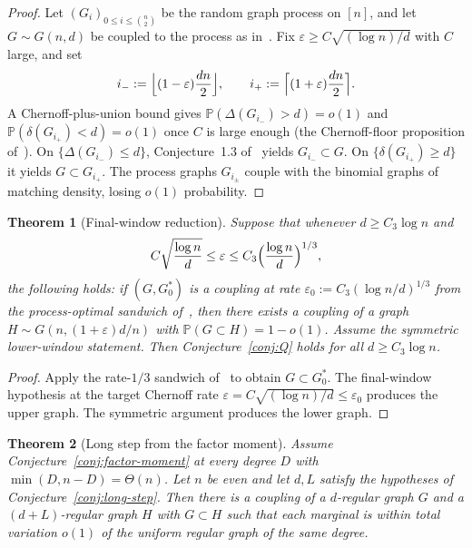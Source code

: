 \documentclass[11pt]{article}
\newtheorem{theorem}{Theorem}
\newcommand{\Gnd}{G(n,d)}
\newcommand{\PP}{\mathbb{P}}
\begin{document}
\begin{proof}
Let \((G_i)_{0\le i\le\binom{n}{2}}\) be the random graph process on \([n]\), and let
\(G\sim\Gnd\) be coupled to the process as in~\cite[Conjecture~1.3]{BIM25}.
Fix \(\varepsilon\ge C\sqrt{(\log n)/d}\) with \(C\) large, and set
\[
i_-:=\Bigl\lfloor(1-\varepsilon)\frac{dn}{2}\Bigr\rfloor,\qquad
i_+:=\Bigl\lceil(1+\varepsilon)\frac{dn}{2}\Bigr\rceil.
\]
A Chernoff-plus-union bound gives
\(\PP(\Delta(G_{i_-})>d)=o(1)\) and \(\PP(\delta(G_{i_+})<d)=o(1)\)
once \(C\) is large enough (the Chernoff-floor proposition of~\cite{PlusOneV1}).
On \(\{\Delta(G_{i_-})\le d\}\), Conjecture~1.3 of~\cite{BIM25} yields
\(G_{i_-}\subset G\).
On \(\{\delta(G_{i_+})\ge d\}\) it yields \(G\subset G_{i_+}\).
The process graphs \(G_{i_\pm}\) couple with the binomial graphs of matching
density, losing \(o(1)\) probability.
\end{proof}

\begin{theorem}[Final-window reduction]
\label{thm:window}
Suppose that whenever \(d\ge C_3\log n\) and
\[
C\sqrt{\frac{\log n}{d}}
\le\varepsilon
\le C_3\Bigl(\frac{\log n}{d}\Bigr)^{1/3},
\]
the following holds: if \((G,G^*_0)\) is a coupling at rate
\(\varepsilon_0:=C_3(\log n/d)^{1/3}\) from the process-optimal sandwich of~\cite{PlusOneV1},
then there exists a coupling of a graph \(H\sim G(n,(1+\varepsilon)d/n)\) with
\(\PP(G\subset H)=1-o(1)\).
Assume the symmetric lower-window statement.
Then Conjecture~\ref{conj:Q} holds for all \(d\ge C_3\log n\).
\end{theorem}

\begin{proof}
Apply the rate-\(1/3\) sandwich of~\cite{PlusOneV1} to obtain \(G\subset G^*_0\).
The final-window hypothesis at the target Chernoff rate
\(\varepsilon=C\sqrt{(\log n)/d}\le\varepsilon_0\) produces the upper graph.
The symmetric argument produces the lower graph.
\end{proof}

\begin{theorem}[Long step from the factor moment]
\label{thm:long-from-moment}
Assume Conjecture~\ref{conj:factor-moment} at every degree \(D\) with
\(\min(D,n-D)=\Theta(n)\).
Let \(n\) be even and let \(d,L\) satisfy the hypotheses of
Conjecture~\ref{conj:long-step}.
Then there is a coupling of a \(d\)-regular graph \(G\) and a \((d+L)\)-regular
graph \(H\) with \(G\subset H\) such that each marginal is within total variation
\(o(1)\) of the uniform regular graph of the same degree.
\end{theorem}
\end{document}
